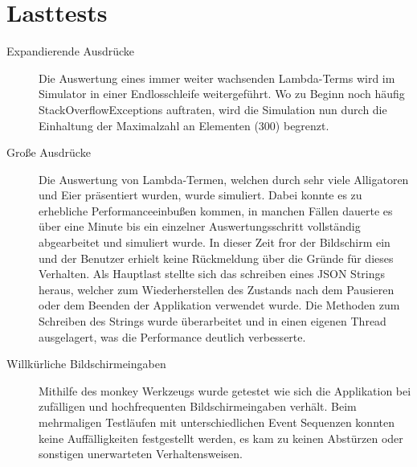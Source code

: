 \chapter{Lasttests}
\begin{description}
	\item[Expandierende Ausdrücke] Die Auswertung eines immer weiter wachsenden Lambda-Terms wird im Simulator in einer Endlosschleife weitergeführt. 
		Wo zu Beginn noch häufig StackOverflowExceptions auftraten, wird die Simulation nun durch die Einhaltung der Maximalzahl an Elementen (300) begrenzt.
		
		\item[Große Ausdrücke] Die Auswertung von Lambda-Termen, welchen durch sehr viele Alligatoren und Eier präsentiert wurden, wurde simuliert. 
		Dabei konnte es zu erhebliche Performanceeinbußen kommen, in manchen Fällen dauerte es über eine Minute bis ein einzelner Auswertungsschritt vollständig abgearbeitet und simuliert wurde. In dieser Zeit fror der Bildschirm ein und der Benutzer erhielt keine Rückmeldung über die Gründe für dieses Verhalten. Als Hauptlast stellte sich das schreiben eines JSON Strings heraus, welcher zum Wiederherstellen des Zustands nach dem Pausieren oder dem Beenden der Applikation verwendet wurde. Die Methoden zum Schreiben des Strings wurde überarbeitet und in einen eigenen Thread ausgelagert, was die Performance deutlich verbesserte.
		
		\item[Willkürliche Bildschirmeingaben] Mithilfe des monkey Werkzeugs wurde getestet wie sich die Applikation bei zufälligen und hochfrequenten Bildschirmeingaben verhält. Beim mehrmaligen Testläufen mit unterschiedlichen Event Sequenzen konnten keine Auffälligkeiten festgestellt werden, es kam zu keinen Abstürzen oder sonstigen unerwarteten Verhaltensweisen.
		
\end{description}
